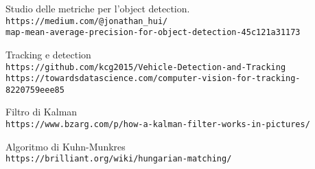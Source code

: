 \begin{thebibliography}{99}
Studio delle metriche per l'object detection.
\\\texttt{https://medium.com/@jonathan\_hui/\\
map-mean-average-precision-for-object-detection-45c121a31173}

Tracking e detection
\\\texttt{https://github.com/kcg2015/Vehicle-Detection-and-Tracking}
\\\texttt{https://towardsdatascience.com/computer-vision-for-tracking-8220759eee85}

Filtro di Kalman
\\\texttt{https://www.bzarg.com/p/how-a-kalman-filter-works-in-pictures/}

Algoritmo di Kuhn-Munkres
\\\texttt{https://brilliant.org/wiki/hungarian-matching/}



\end{thebibliography}